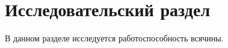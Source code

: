 \chapter{Исследовательский раздел}
\label{cha:research}

В данном разделе исследуется работоспособность всячины.

